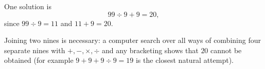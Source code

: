 One solution is
\[
\boxed{99\div9+9=20},
\]
since $99\div9=11$ and $11+9=20$.

Joining two nines is necessary: a computer search over all ways of combining four separate nines with $+,-,\times,\div$ and any bracketing shows that $20$ cannot be obtained (for example $9+9+9\div9=19$ is the closest natural attempt).
